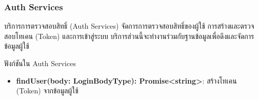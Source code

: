 \subsubsection{Auth Services}
\ifenglish
\else
บริการการตรวจสอบสิทธิ์ (Auth Services) จัดการการตรวจสอบสิทธิ์ของผู้ใช้ การสร้างและตรวจสอบโทเคน (Token) และการเข้าสู่ระบบ บริการส่วนนี้จะทำงานร่วมกับฐานข้อมูลเพื่อดึงและจัดการข้อมูลผู้ใช้

ฟังก์ชันใน Auth Services

\begin{itemize}
    \item \textbf{findUser(body: LoginBodyType): Promise<string>}: สร้างโทเคน (Token) จากข้อมูลผู้ใช้
\end{itemize}
\fi